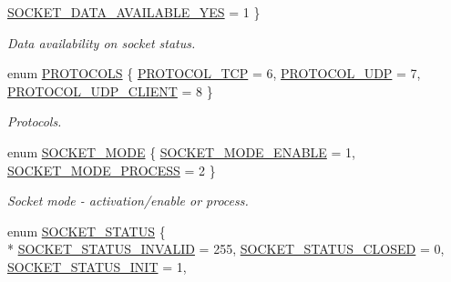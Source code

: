\begin{DoxyCompactItemize}
\hyperlink{group__wireless__interface_gga89e48ba1366c2ef59edbdf4e84df52bba2a7c83420792cb720d29006242753c7c}{S\+O\+C\+K\+E\+T\+\_\+\+D\+A\+T\+A\+\_\+\+A\+V\+A\+I\+L\+A\+B\+L\+E\+\_\+\+Y\+ES} = 1
 \}\begin{DoxyCompactList}\small\item\em Data availability on socket status. \end{DoxyCompactList}
\item 
enum \hyperlink{group__wireless__interface_ga2966051bfea778d846d94013f7cb888d}{P\+R\+O\+T\+O\+C\+O\+LS} \{ \hyperlink{group__wireless__interface_gga2966051bfea778d846d94013f7cb888dae991c7cad918269624b3c28147e18a93}{P\+R\+O\+T\+O\+C\+O\+L\+\_\+\+T\+CP} = 6, 
\hyperlink{group__wireless__interface_gga2966051bfea778d846d94013f7cb888da3c79df624160aa6dbeeb4e2c13ca3dc7}{P\+R\+O\+T\+O\+C\+O\+L\+\_\+\+U\+DP} = 7, 
\hyperlink{group__wireless__interface_gga2966051bfea778d846d94013f7cb888daae722834ed0570e683dd89a383c9cc6a}{P\+R\+O\+T\+O\+C\+O\+L\+\_\+\+U\+D\+P\+\_\+\+C\+L\+I\+E\+NT} = 8
 \}\begin{DoxyCompactList}\small\item\em Protocols. \end{DoxyCompactList}
\item 
enum \hyperlink{group__wireless__interface_ga2bd47c85b6411d92d82236c49fbaf567}{S\+O\+C\+K\+E\+T\+\_\+\+M\+O\+DE} \{ \hyperlink{group__wireless__interface_gga2bd47c85b6411d92d82236c49fbaf567a27f9a7786e887936fa93893312821fe0}{S\+O\+C\+K\+E\+T\+\_\+\+M\+O\+D\+E\+\_\+\+E\+N\+A\+B\+LE} = 1, 
\hyperlink{group__wireless__interface_gga2bd47c85b6411d92d82236c49fbaf567a85c612afc4a587d9ccb67ca9ba78d20f}{S\+O\+C\+K\+E\+T\+\_\+\+M\+O\+D\+E\+\_\+\+P\+R\+O\+C\+E\+SS} = 2
 \}\begin{DoxyCompactList}\small\item\em Socket mode -\/ activation/enable or process. \end{DoxyCompactList}
\item 
enum \hyperlink{group__wireless__interface_gab7faea06bd57469129426e00fcdfe8c7}{S\+O\+C\+K\+E\+T\+\_\+\+S\+T\+A\+T\+US} \{ \\*
\hyperlink{group__wireless__interface_ggab7faea06bd57469129426e00fcdfe8c7ad966b85f9f58bbdc162e40b1f7bf351e}{S\+O\+C\+K\+E\+T\+\_\+\+S\+T\+A\+T\+U\+S\+\_\+\+I\+N\+V\+A\+L\+ID} = 255, 
\hyperlink{group__wireless__interface_ggab7faea06bd57469129426e00fcdfe8c7a3da8e4770a81565bb707ffcf0c7010a9}{S\+O\+C\+K\+E\+T\+\_\+\+S\+T\+A\+T\+U\+S\+\_\+\+C\+L\+O\+S\+ED} = 0, 
\hyperlink{group__wireless__interface_ggab7faea06bd57469129426e00fcdfe8c7aa33144a60f78ef0aecce8542bdb67c1d}{S\+O\+C\+K\+E\+T\+\_\+\+S\+T\+A\+T\+U\+S\+\_\+\+I\+N\+IT} = 1, 

\end{DoxyCompactItemize}
